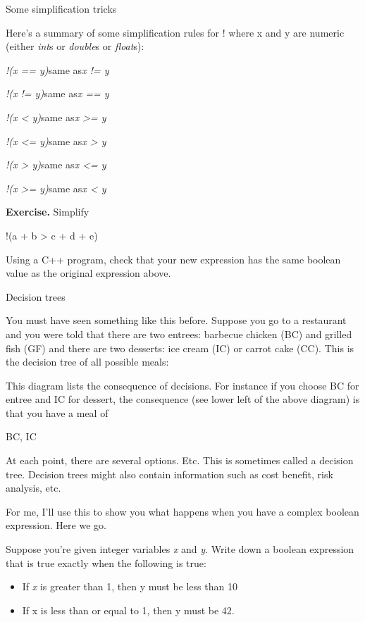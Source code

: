 \documentclass[
]{article}
\providecommand{\tightlist}{%
  \setlength{\itemsep}{0pt}\setlength{\parskip}{0pt}}
\begin{document}
Some simplification tricks

Here's a summary of some simplification rules for ! where x and y are
numeric (either \emph{int}s or \emph{double}s or \emph{float}s):

\emph{!(x == y)}same as\emph{x != y}

\emph{!(x != y)}same as\emph{x == y}

\emph{!(x \textless{} y)}same as\emph{x \textgreater= y}

\emph{!(x \textless= y)}same as\emph{x \textgreater{} y}

\emph{!(x \textgreater{} y)}same as\emph{x \textless= y}

\emph{!(x \textgreater= y)}same as\emph{x \textless{} y}

\textbf{Exercise.} Simplify

!(a + b \textgreater{} c + d + e)

Using a C++ program, check that your new expression has the same boolean
value as the original expression above.

Decision trees

You must have seen something like this before. Suppose you go to a
restaurant and you were told that there are two entrees: barbecue
chicken (BC) and grilled fish (GF) and there are two desserts: ice cream
(IC) or carrot cake (CC). This is the decision tree of all possible
meals:

This diagram lists the consequence of decisions. For instance if you
choose BC for entree and IC for dessert, the consequence (see lower left
of the above diagram) is that you have a meal of

BC, IC

At each point, there are several options. Etc. This is sometimes called
a decision tree. Decision trees might also contain information such as
cost benefit, risk analysis, etc.

For me, I'll use this to show you what happens when you have a complex
boolean expression. Here we go.

Suppose you're given integer variables \emph{x} and \emph{y}. Write down
a boolean expression that is true exactly when the following is true:

\begin{itemize}
\tightlist
\item
  If \emph{x} is greater than 1, then y must be less than 10
\item
  If x is less than or equal to 1, then y must be 42.
\end{itemize}
\end{document}
